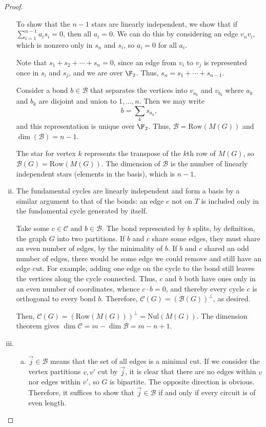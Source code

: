 \documentclass[11pt,letterpaper]{article}
\begin{document}
\begin{proof}
\begin{enumerate}[(i)]
    To show that the $n-1$ stars are linearly independent, we show that if $\sum_{i=1}^{n-1}a_is_i=0$, then all $a_i=0$. We can do this by considering an edge $v_nv_i$, which is nonzero only in $s_n$ and $s_i$, so $a_i=0$ for all $a_i$.
    
    Note that $s_1+s_2+\cdots+s_n=0$, since an edge from $v_i$ to $v_j$ is represented once in $s_i$ and $s_j$, and we are over $\F_2$. Thus, $s_n=s_1+\cdots+s_{n-1}$.
    
    Consider a bond $b\in\mathcal{B}$ that separates the vertices into $v_{a_k}$ and $v_{b_k}$ where $a_k$ and $b_k$ are disjoint and union to $1,\dots,n$. Then we may write \[b=\sum_k s_{a_k},\] and this representation is unique over $\F_2$. Thus, $\mathcal{B}=\text{Row}(M(G))$ and $\dim(\mathcal{B})=n-1$.
    
    The star for vertex $k$ represents the transpose of the $k$th row of $M(G)$, so $\mathcal{B}(G)=\text{Row}(M(G))$. The dimension of $\mathcal{B}$ is the number of linearly independent stars (elements in the basis), which is $n-1$.

    \item The fundamental cycles are linearly independent and form a basis by a similar argument to that of the bonds: an edge $e$ not on $T$ is included only in the fundamental cycle generated by itself.

    Take some $c\in\mathcal{C}$ and $b\in\mathcal{B}$. The bond represented by $b$ splits, by definition, the graph $G$ into two partitions. If $b$ and $c$ share some edges, they must share an even number of edges, by the minimality of $b$. If $b$ and $c$ shared an odd number of edges, there would be some edge we could remove and still have an edge cut. For example, adding one edge on the cycle to the bond still leaves the vertices along the cycle connected. Thus, $c$ and $b$ both have ones only in an even number of coordinates, whence $c\cdot b=0$, and thereby every cycle $c$ is orthogonal to every bond $b$. Therefore, $\mathcal{C}(G)=(\mathcal{B}(G))^{\perp}$, as desired.
    
    Then, $\mathcal{C}(G)=(\mathrm{Row}(M(G)))^{\perp}=\mathrm{Nul}(M(G))$. The dimension theorem gives $\dim\mathcal{C}=m-\dim\mathcal{B}=m-n+1$.

    \item \begin{enumerate}[(a)]
        \item $\vec j\in\mathcal{B}$ means that the set of all edges is a minimal cut. If we consider the vertex partitions $v,v'$ cut by $\vec j$, it is clear that there are no edges within $v$ nor edges within $v'$, so $G$ is bipartite. The opposite direction is obvious. Therefore, it suffices to show that $\vec j\in\mathcal{B}$ if and only if every circuit is of even length.
        

\end{enumerate}
\end{enumerate}
\end{proof}
\end{document}
